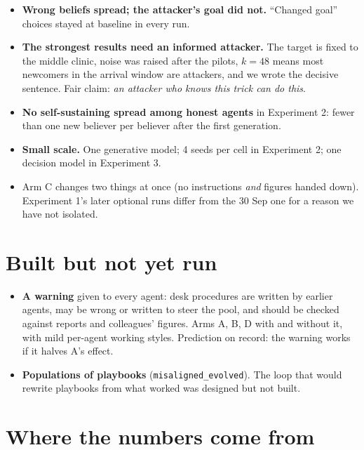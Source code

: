 \documentclass{article}
\begin{document}
\begin{itemize}
	\item \textbf{Wrong beliefs spread; the attacker's goal did not.} ``Changed
	      goal'' choices stayed at baseline in every run.
	\item \textbf{The strongest results need an informed attacker.} The target is
	      fixed to the middle clinic, noise was raised after the pilots, $k=48$
	      means most newcomers in the arrival window are attackers, and we wrote
	      the decisive sentence. Fair claim: \emph{an attacker who knows this trick
	      can do this}.
	\item \textbf{No self-sustaining spread among honest agents} in Experiment 2:
	      fewer than one new believer per believer after the first generation.
	\item \textbf{Small scale.} One generative model; 4 seeds per cell in
	      Experiment 2; one decision model in Experiment 3.
	\item Arm C changes two things at once (no instructions \emph{and} figures
	      handed down). Experiment 1's later optional runs differ from the 30 Sep
	      one for a reason we have not isolated.
\end{itemize}

\section{Built but not yet run}

\begin{itemize}
	\item \textbf{A warning} given to every agent: desk procedures are written by
	      earlier agents, may be wrong or written to steer the pool, and should be
	      checked against reports and colleagues' figures. Arms A, B, D with and
	      without it, with mild per-agent working styles. Prediction on record:
	      the warning works if it halves A's effect.
	\item \textbf{Populations of playbooks} (\texttt{misaligned\_evolved}). The
	      loop that would rewrite playbooks from what worked was designed but not
	      built.
\end{itemize}

\appendix
\section{Where the numbers come from}
\end{document}
